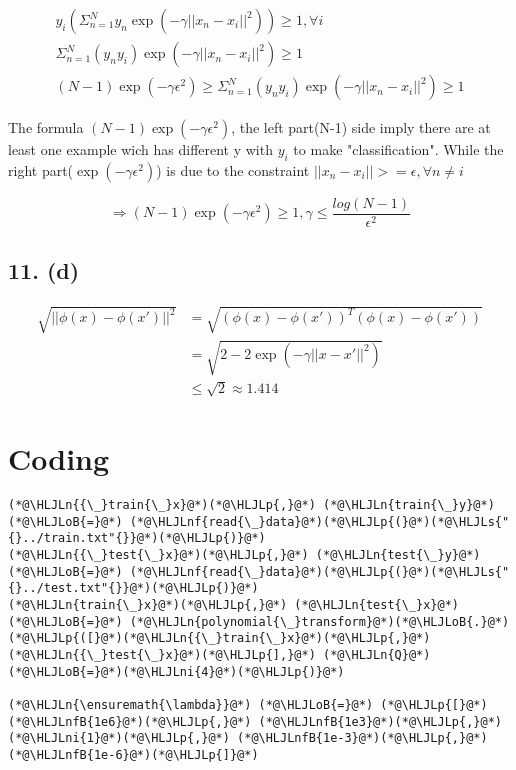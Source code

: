 \documentclass[12pt,a4paper]{article}
\newcommand{\HLJLn}[1]{#1}
\newcommand{\HLJLnf}[1]{\textcolor[RGB]{66,102,213}{#1}}
\newcommand{\HLJLs}[1]{\textcolor[RGB]{201,61,57}{#1}}
\newcommand{\HLJLnfB}[1]{\textcolor[RGB]{59,151,46}{#1}}
\newcommand{\HLJLni}[1]{\textcolor[RGB]{59,151,46}{#1}}
\newcommand{\HLJLoB}[1]{\textcolor[RGB]{102,102,102}{\textbf{#1}}}
\newcommand{\HLJLp}[1]{#1}
\begin{document}
\begin{align}
y_i(\Sigma_{n=1}^N y_n \exp(-\gamma||x_n-x_i||^2)) \ge 1, \forall i \\
\Sigma_{n=1}^N (y_ny_i) \exp(-\gamma||x_n-x_i||^2) \ge 1 \\
(N-1)\exp(-\gamma\epsilon^2) \ge \Sigma_{n=1}^N (y_ny_i) \exp(-\gamma||x_n-x_i||^2) \ge 1
\end{align}

The formula $(N-1)\exp(-\gamma\epsilon^2)$, the left part(N-1) side imply there are at  least one example wich has different y with $y_i$ to make "classification". While the right part($\exp(-\gamma\epsilon^2)$) is due to the constraint $|| x_n-x_i || >= \epsilon, \forall n \neq i$

\[
\Rightarrow 
    (N-1)\exp(-\gamma\epsilon^2) \ge 1, \gamma \le \frac{log(N-1)}{\epsilon^2}
\]
\subsection{11. (d)}
\[
\begin{split}
    \sqrt{|| \phi(x)-\phi(x') ||^2}
    &= \sqrt{(\phi(x)-\phi(x'))^T(\phi(x)-\phi(x'))} \\
    &= \sqrt{2-2\exp(-\gamma || x-x' ||^2)} \\
    &\le \sqrt{2} \approx 1.414
\end{split}
\]
\section{Coding}


\begin{lstlisting}
(*@\HLJLn{{\_}train{\_}x}@*)(*@\HLJLp{,}@*) (*@\HLJLn{train{\_}y}@*) (*@\HLJLoB{=}@*) (*@\HLJLnf{read{\_}data}@*)(*@\HLJLp{(}@*)(*@\HLJLs{"{}../train.txt"{}}@*)(*@\HLJLp{)}@*)
(*@\HLJLn{{\_}test{\_}x}@*)(*@\HLJLp{,}@*) (*@\HLJLn{test{\_}y}@*) (*@\HLJLoB{=}@*) (*@\HLJLnf{read{\_}data}@*)(*@\HLJLp{(}@*)(*@\HLJLs{"{}../test.txt"{}}@*)(*@\HLJLp{)}@*)
(*@\HLJLn{train{\_}x}@*)(*@\HLJLp{,}@*) (*@\HLJLn{test{\_}x}@*) (*@\HLJLoB{=}@*) (*@\HLJLn{polynomial{\_}transform}@*)(*@\HLJLoB{.}@*)(*@\HLJLp{([}@*)(*@\HLJLn{{\_}train{\_}x}@*)(*@\HLJLp{,}@*) (*@\HLJLn{{\_}test{\_}x}@*)(*@\HLJLp{],}@*) (*@\HLJLn{Q}@*)(*@\HLJLoB{=}@*)(*@\HLJLni{4}@*)(*@\HLJLp{)}@*)

(*@\HLJLn{\ensuremath{\lambda}}@*) (*@\HLJLoB{=}@*) (*@\HLJLp{[}@*)(*@\HLJLnfB{1e6}@*)(*@\HLJLp{,}@*) (*@\HLJLnfB{1e3}@*)(*@\HLJLp{,}@*) (*@\HLJLni{1}@*)(*@\HLJLp{,}@*) (*@\HLJLnfB{1e-3}@*)(*@\HLJLp{,}@*) (*@\HLJLnfB{1e-6}@*)(*@\HLJLp{]}@*)
\end{lstlisting}
\end{document}
